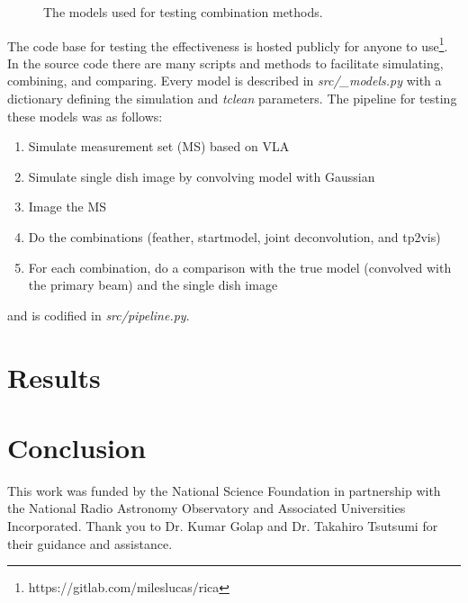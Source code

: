 \documentclass[manuscript,linenumbers]{aastex62}
\begin{document}
\begin{figure*}[t]
    \caption{The models used for testing combination methods.}
    \label{fig:models}
\end{figure*}

The code base for testing the effectiveness is hosted publicly for anyone to use\footnote{https://gitlab.com/mileslucas/rica}. In the source code there are many scripts and methods to facilitate simulating, combining, and comparing. Every model is described in \textit{src/\_models.py} with a dictionary defining the simulation and \textit{tclean} parameters. The pipeline for testing these models was as follows:
\begin{enumerate}
    \item Simulate measurement set (MS) based on VLA
    \item Simulate single dish image by convolving model with Gaussian
    \item Image the MS 
    \item Do the combinations (feather, startmodel, joint deconvolution, and tp2vis)
    \item For each combination, do a comparison with the true model (convolved with the primary beam) and the single dish image
\end{enumerate}
and is codified in \textit{src/pipeline.py}. 


\section{Results}

\section{Conclusion}


\acknowledgments
This work was funded by the National Science Foundation in partnership with the National Radio Astronomy Observatory and Associated Universities Incorporated. Thank you to Dr. Kumar Golap and Dr. Takahiro Tsutsumi for their guidance and assistance. 


\end{document}
